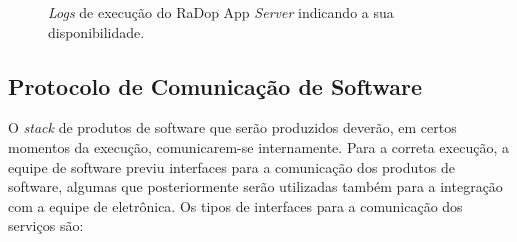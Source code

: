 \begin{figure}[H]
	\caption{\label{fig:radop-app-server} \textit{Logs} de execução do RaDop App \textit{Server} indicando a sua disponibilidade.}
\end{figure}

\subsection{Protocolo de Comunicação de Software}

O \textit{stack} de produtos de software que serão produzidos deverão, em certos momentos da execução, comunicarem-se internamente. Para a correta execução, a equipe de software previu interfaces para a comunicação dos produtos de software, algumas que posteriormente serão utilizadas também para a integração com a equipe de eletrônica.
Os tipos de interfaces para a comunicação dos serviços são:
